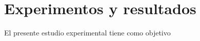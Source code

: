 \chapter{Experimentos y resultados}
\label{chapter:experiment}

El presente estudio experimental tiene como objetivo